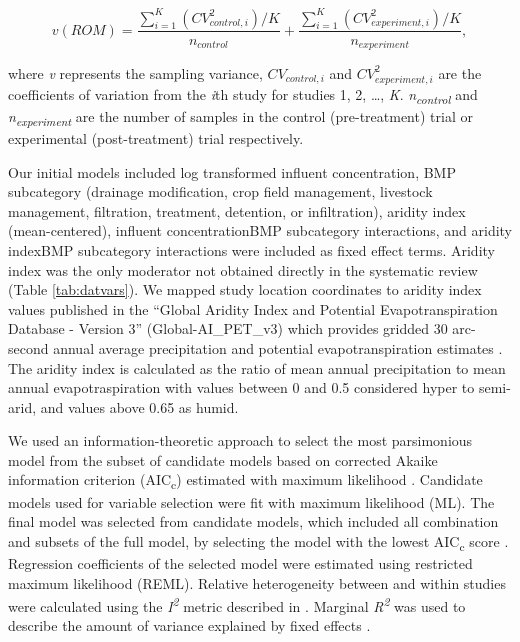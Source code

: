 \documentclass[utf8]{FrontiersinHarvard}
\begin{document}
\[
v(ROM) = \frac{\sum_{i=1}^{K}{(CV^2_{control,i})/K}}{n_{control}} + \frac{\sum_{i=1}^{K}{(CV^2_{experiment,i})/K}}{n_{experiment}},
\]

where \emph{v} represents the sampling variance, \(CV_{control,i}\) and \(CV^2_{experiment,i}\) are the coefficients of variation from the \emph{i}th study for studies 1, 2, \ldots, \emph{K}. \emph{n\textsubscript{control}} and \emph{n\textsubscript{experiment}} are the number of samples in the control (pre-treatment) trial or experimental (post-treatment) trial respectively.

Our initial models included log transformed influent concentration, BMP subcategory (drainage modification, crop field management, livestock management, filtration, treatment, detention, or infiltration), aridity index (mean-centered), influent concentration\texttimes BMP subcategory interactions, and aridity index\texttimes BMP subcategory interactions were included as fixed effect terms.
Aridity index was the only moderator not obtained directly in the systematic review (Table \ref{tab:datvars}).
We mapped study location coordinates to aridity index values published in the ``Global Aridity Index and Potential Evapotranspiration Database - Version 3'' (Global-AI\_PET\_v3) which provides gridded 30 arc-second annual average precipitation and potential evapotranspiration estimates \citep{zomerVersionGlobalAridity2022}.
The aridity index is calculated as the ratio of mean annual precipitation to mean annual evapotraspiration with values between 0 and 0.5 considered hyper to semi-arid, and values above 0.65 as humid.

We used an information-theoretic approach to select the most parsimonious model from the subset of candidate models based on corrected Akaike information criterion (AIC\textsubscript{c}) estimated with maximum likelihood \citep{cinarUsingInformationTheoretic2021}.
Candidate models used for variable selection were fit with maximum likelihood (ML).
The final model was selected from candidate models, which included all combination and subsets of the full model, by selecting the model with the lowest AIC\textsubscript{c} score \citep{burnhamAICModelSelection2011, cinarUsingInformationTheoretic2021}.
Regression coefficients of the selected model were estimated using restricted maximum likelihood (REML).
Relative heterogeneity between and within studies were calculated using the \emph{I\textsuperscript{2}} metric described in \citet{nakagawaMethodologicalIssuesAdvances2012}.
Marginal \emph{R\textsuperscript{2}} was used to describe the amount of variance explained by fixed effects \citep{nakagawaGeneralSimpleMethod2013}.
\end{document}
